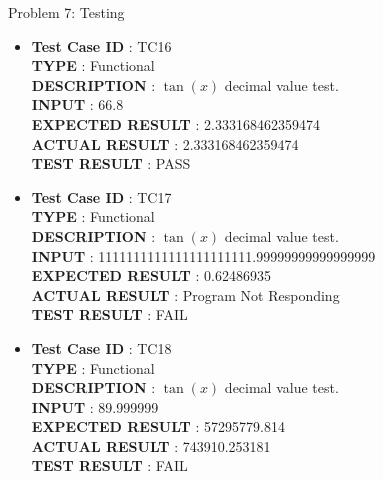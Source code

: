 \documentclass[a4paper,12pt]{article}
\begin{document}
\begin{section}{Problem 7: Testing}
\begin{itemize}
\item \textbf{Test Case ID} \hspace{1.85cm} : TC16  \\
\textbf{TYPE } \hspace{3.05cm}  : Functional\\
\textbf{DESCRIPTION }\hspace{1.15cm} : $\tan(x)$ decimal value test. \\
\textbf{INPUT} \hspace{3.05cm} :  66.8 \\
\textbf{EXPECTED RESULT} \hspace{0.01cm} : 2.333168462359474 \\
\textbf{ACTUAL RESULT} \hspace{0.6cm} : 2.333168462359474  \\
\textbf{TEST RESULT} \hspace{1.45cm} : PASS \\

\item \textbf{Test Case ID} \hspace{1.85cm} : TC17  \\
\textbf{TYPE } \hspace{3.05cm}  : Functional\\
\textbf{DESCRIPTION }\hspace{1.15cm} : $\tan(x)$ decimal value test. \\
\textbf{INPUT} \hspace{3.05cm} :  1111111111111111111111.99999999999999999 \\
\textbf{EXPECTED RESULT} \hspace{0.01cm} : 0.62486935  \\
\textbf{ACTUAL RESULT} \hspace{0.6cm} : Program Not Responding \\
\textbf{TEST RESULT} \hspace{1.45cm} : FAIL \\	

\item \textbf{Test Case ID} \hspace{1.85cm} : TC18 \\
\textbf{TYPE } \hspace{3.05cm}  : Functional\\
\textbf{DESCRIPTION }\hspace{1.15cm} : $\tan(x)$ decimal value test. \\
\textbf{INPUT} \hspace{3.05cm} :  89.999999 \\
\textbf{EXPECTED RESULT} \hspace{0.01cm} : 57295779.814 \\
\textbf{ACTUAL RESULT} \hspace{0.6cm} : 743910.253181 \\
\textbf{TEST RESULT} \hspace{1.45cm} : FAIL \\


\end{itemize}
\end{section}
\end{document}
